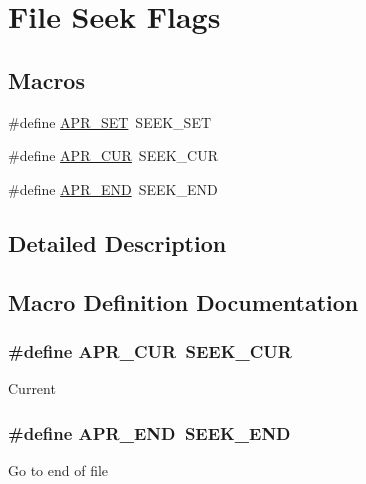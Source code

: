 \hypertarget{group__apr__file__seek__flags}{}\section{File Seek Flags}
\label{group__apr__file__seek__flags}
\subsection*{Macros}
\begin{DoxyCompactItemize}
\item 
\#define \hyperlink{group__apr__file__seek__flags_ga2fdf78845c897f69451d49e1e2b90ac9}{A\+P\+R\+\_\+\+S\+ET}~S\+E\+E\+K\+\_\+\+S\+ET
\item 
\#define \hyperlink{group__apr__file__seek__flags_gae17abc53fea00bfd51e184017113e250}{A\+P\+R\+\_\+\+C\+UR}~S\+E\+E\+K\+\_\+\+C\+UR
\item 
\#define \hyperlink{group__apr__file__seek__flags_ga438f3568be799d1e4bbd19492ca47d22}{A\+P\+R\+\_\+\+E\+ND}~S\+E\+E\+K\+\_\+\+E\+ND
\end{DoxyCompactItemize}


\subsection{Detailed Description}


\subsection{Macro Definition Documentation}
\subsubsection[{\texorpdfstring{A\+P\+R\+\_\+\+C\+UR}{APR_CUR}}]{\setlength{\rightskip}{0pt plus 5cm}\#define A\+P\+R\+\_\+\+C\+UR~S\+E\+E\+K\+\_\+\+C\+UR}\hypertarget{group__apr__file__seek__flags_gae17abc53fea00bfd51e184017113e250}{}\label{group__apr__file__seek__flags_gae17abc53fea00bfd51e184017113e250}
Current 
\subsubsection[{\texorpdfstring{A\+P\+R\+\_\+\+E\+ND}{APR_END}}]{\setlength{\rightskip}{0pt plus 5cm}\#define A\+P\+R\+\_\+\+E\+ND~S\+E\+E\+K\+\_\+\+E\+ND}\hypertarget{group__apr__file__seek__flags_ga438f3568be799d1e4bbd19492ca47d22}{}\label{group__apr__file__seek__flags_ga438f3568be799d1e4bbd19492ca47d22}
Go to end of file 
